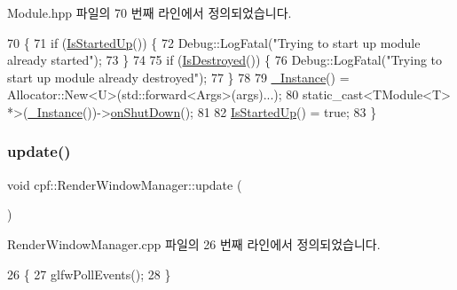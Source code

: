 Module.\+hpp 파일의 70 번째 라인에서 정의되었습니다.


\begin{DoxyCode}
70                                             \{
71             \textcolor{keywordflow}{if} (\hyperlink{classcpf_1_1_t_module_a73732afee7131dad652bf3e00c75cef9}{IsStartedUp}()) \{
72                 Debug::LogFatal(\textcolor{stringliteral}{"Trying to start up module already started"});
73             \}
74 
75             \textcolor{keywordflow}{if} (\hyperlink{classcpf_1_1_t_module_a9f70f0a70ac59b13b7a874f82c877337}{IsDestroyed}()) \{
76                 Debug::LogFatal(\textcolor{stringliteral}{"Trying to start up module already destroyed"});
77             \}
78 
79             \hyperlink{classcpf_1_1_t_module_a06ab8af8ea6b294959937fd2bbc1e615}{\_Instance}() = Allocator::New<U>(std::forward<Args>(args)...);
80             \textcolor{keyword}{static\_cast<}TModule<T> *\textcolor{keyword}{>}(\hyperlink{classcpf_1_1_t_module_a06ab8af8ea6b294959937fd2bbc1e615}{\_Instance}())->\hyperlink{classcpf_1_1_t_module_a15c93b1aca54022e145961bea8e3ea7d}{onShutDown}();
81 
82             \hyperlink{classcpf_1_1_t_module_a73732afee7131dad652bf3e00c75cef9}{IsStartedUp}() = \textcolor{keyword}{true};
83         \}
\end{DoxyCode}
\mbox{\label{classcpf_1_1_render_window_manager_adc7ef3bd3f5c4ad9b86899adeb69b0ee}} 
\subsubsection{\texorpdfstring{update()}{update()}}
{\footnotesize\ttfamily void cpf\+::\+Render\+Window\+Manager\+::update (\begin{DoxyParamCaption}{ }\end{DoxyParamCaption})}



Render\+Window\+Manager.\+cpp 파일의 26 번째 라인에서 정의되었습니다.


\begin{DoxyCode}
26                                      \{
27         glfwPollEvents();
28     \}
\end{DoxyCode}
\mbox{\label{classcpf_1_1_render_window_manager_a3b667bdac352e584a3dc6b8132054b36}} 
